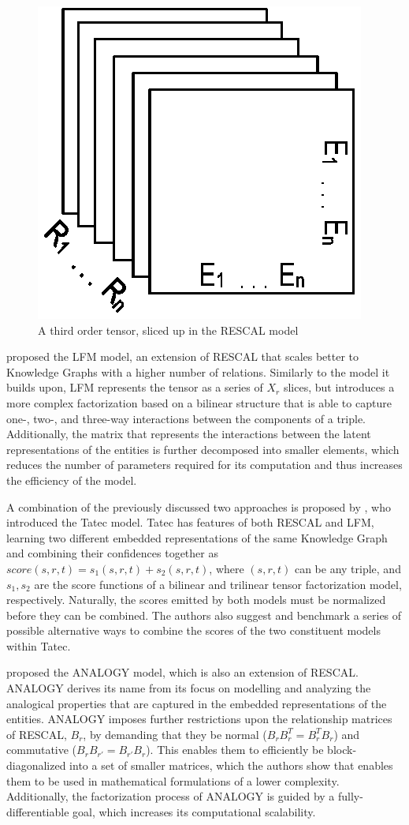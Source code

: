 \begin{figure}[!htp]
    \centering
    \includegraphics[width=.4\textwidth]{fig/embedding/sliced}
    \caption{A third order tensor, sliced up in the RESCAL model}
    \label{fig:emb-rescal}
\end{figure}


\citet{jenatton2012} proposed the LFM model, an extension of RESCAL that scales better to Knowledge Graphs with a higher number of relations. Similarly to the model it builds upon, LFM represents the tensor as a series of $X_r$ slices, but introduces a more complex factorization based on a bilinear structure that is able to capture one-, two-, and three-way interactions between the components of a triple. Additionally, the matrix that represents the interactions between the latent representations of the entities is further decomposed into smaller elements, which reduces the number of parameters required for its computation and thus increases the efficiency of the model.

A combination of the previously discussed two approaches is proposed by \citet{garcia-duran2015}, who introduced the Tatec model. Tatec has features of both RESCAL and LFM, learning two different embedded representations of the same Knowledge Graph and combining their confidences together as $score(s, r ,t) = s_1(s, r, t) + s_2(s, r, t)$, where $(s, r ,t)$ can be any triple, and $s_1, s_2$ are the score functions of a bilinear and trilinear tensor factorization model, respectively. Naturally, the scores emitted by both models must be normalized before they can be combined. The authors also suggest and benchmark a series of possible alternative ways to combine the scores of the two constituent models within Tatec.

\citet{liu2017} proposed the ANALOGY model, which is also an extension of RESCAL. ANALOGY derives its name from its focus on modelling and analyzing the analogical properties that are captured in the embedded representations of the entities. ANALOGY imposes further restrictions upon the relationship matrices of RESCAL, $B_r$, by demanding that they be normal ($B_rB_r^T = B_r^TB_r$) and commutative ($B_rB_{r'} = B_{r'}B_r$). This enables them to efficiently be block-diagonalized into a set of smaller matrices, which the authors show that enables them to be used in mathematical formulations of a lower complexity. Additionally, the factorization process of ANALOGY is guided by a fully-differentiable goal, which increases its computational scalability. 

